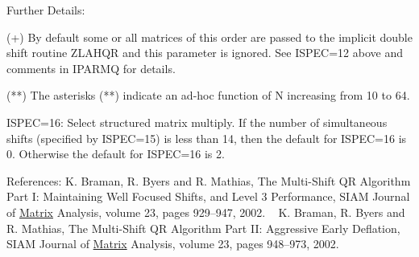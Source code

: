 \begin{DoxyParagraph}{Further Details\+: }
\begin{DoxyVerb}
                  (+)  By default some or all matrices of this order
                       are passed to the implicit double shift routine
                       ZLAHQR and this parameter is ignored.  See
                       ISPEC=12 above and comments in IPARMQ for
                       details.

                 (**)  The asterisks (**) indicate an ad-hoc
                       function of N increasing from 10 to 64.

            ISPEC=16: Select structured matrix multiply.
                      If the number of simultaneous shifts (specified
                      by ISPEC=15) is less than 14, then the default
                      for ISPEC=16 is 0.  Otherwise the default for
                      ISPEC=16 is 2.\end{DoxyVerb}
 
\end{DoxyParagraph}
\begin{DoxyParagraph}{References\+: }
K. Braman, R. Byers and R. Mathias, The Multi-\/\+Shift Q\+R Algorithm Part I\+: Maintaining Well Focused Shifts, and Level 3 Performance, S\+I\+A\+M Journal of \hyperlink{classMatrix}{Matrix} Analysis, volume 23, pages 929--947, 2002. ~\newline
 K. Braman, R. Byers and R. Mathias, The Multi-\/\+Shift Q\+R Algorithm Part I\+I\+: Aggressive Early Deflation, S\+I\+A\+M Journal of \hyperlink{classMatrix}{Matrix} Analysis, volume 23, pages 948--973, 2002. 
\end{DoxyParagraph}
